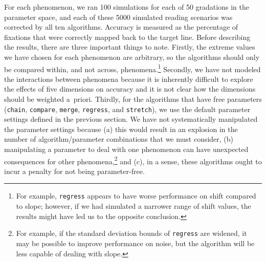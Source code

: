 \documentclass[doc,biblatex]{apa7}
\begin{document}
For each phenomenon, we ran 100 simulations for each of 50 gradations in the parameter space, and each of these 5000 simulated reading scenarios was corrected by all ten algorithms. Accuracy is measured as the percentage of fixations that were correctly mapped back to the target line. Before describing the results, there are three important things to note. Firstly, the extreme values we have chosen for each phenomenon are arbitrary, so the algorithms should only be compared within, and not across, phenomena.\footnote{For example, \texttt{regress} appears to have worse performance on shift compared to slope; however, if we had simulated a narrower range of shift values, the results might have led us to the opposite conclusion.} Secondly, we have not modeled the interactions between phenomena because it is inherently difficult to explore the effects of five dimensions on accuracy and it is not clear how the dimensions should be weighted a~priori. Thirdly, for the algorithms that have free parameters (\texttt{chain}, \texttt{compare}, \texttt{merge}, \texttt{regress}, and \texttt{stretch}), we use the default parameter settings defined in the previous section. We have not systematically manipulated the parameter settings because (a) this would result in an explosion in the number of algorithm/parameter combinations that we must consider, (b) manipulating a parameter to deal with one phenomenon can have unexpected consequences for other phenomena,\footnote{For example, if the standard deviation bounds of \texttt{regress} are widened, it may be possible to improve performance on noise, but the algorithm will be less capable of dealing with slope.} and (c), in a sense, these algorithms ought to incur a penalty for not being parameter-free.
\end{document}
